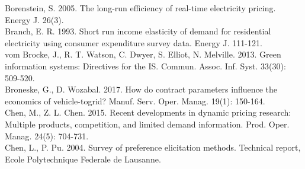 \documentclass[10pt]{article}
\begin{document}
Borenstein, S. 2005. The long-run efficiency of real-time electricity pricing. Energy J. 26(3).\\
Branch, E. R. 1993. Short run income elasticity of demand for residential electricity using consumer expenditure survey data. Energy J. 111-121.\\
vom Brocke, J., R. T. Watson, C. Dwyer, S. Elliot, N. Melville. 2013. Green information systems: Directives for the IS. Commun. Assoc. Inf. Syst. 33(30): 509-520.\\
Broneske, G., D. Wozabal. 2017. How do contract parameters influence the economics of vehicle-togrid? Manuf. Serv. Oper. Manag. 19(1): 150-164.\\
Chen, M., Z. L. Chen. 2015. Recent developments in dynamic pricing research: Multiple products, competition, and limited demand information. Prod. Oper. Manag. 24(5): 704-731.\\
Chen, L., P. Pu. 2004. Survey of preference elicitation methods. Technical report, Ecole Polytechnique Federale de Lausanne.
\end{document}
